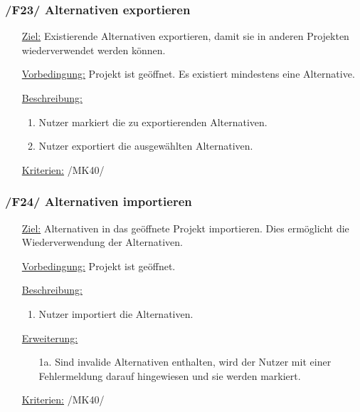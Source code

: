 \documentclass{article}
\begin{document}
\subsubsection*{\textbf{/F23/} Alternativen exportieren} \label{sec:f:Alternativen exportieren}
\begin{itemize}
    \item[\underline{Ziel:}] Existierende Alternativen exportieren, damit sie in anderen Projekten wiederverwendet werden können.
    \item[\underline{Vorbedingung:}] Projekt ist geöffnet. Es existiert mindestens eine Alternative.
    \item[\underline{Beschreibung:}]
    \begin{enumerate}
        \item Nutzer markiert die zu exportierenden Alternativen.
        \item Nutzer exportiert die ausgewählten Alternativen. 
    \end{enumerate}
    \item[\underline{Kriterien:}] /MK40/
\end{itemize}

\subsubsection*{\textbf{/F24/} Alternativen importieren}
\label{sec:f:Alternativen importieren}
\begin{itemize}
    \item[\underline{Ziel:}] Alternativen in das geöffnete Projekt importieren. Dies ermöglicht die Wiederverwendung der Alternativen.
    \item[\underline{Vorbedingung:}] Projekt ist geöffnet.
    \item[\underline{Beschreibung:}]
    \begin{enumerate}
        \item Nutzer importiert die Alternativen. 
    \end{enumerate}
    \item[\underline{Erweiterung:}]
    \begin{itemize}
        \item[1a.] Sind invalide Alternativen enthalten, wird der Nutzer mit einer Fehlermeldung darauf hingewiesen und sie werden markiert. 
    \end{itemize}
    \item[\underline{Kriterien:}] /MK40/
\end{itemize}
\end{document}
